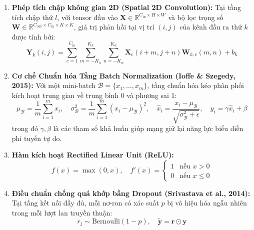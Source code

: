 \begin{enumerate}
    \item \textbf{Phép tích chập không gian 2D (Spatial 2D Convolution):} Tại tầng tích chập thứ $l$, với tensor đầu vào $\mathbf{X} \in \mathbb{R}^{C_{\text{in}} \times H \times W}$ và bộ lọc trọng số $\mathbf{W} \in \mathbb{R}^{C_{\text{out}} \times C_{\text{in}} \times K \times K}$, giá trị phản hồi tại vị trí $(i, j)$ của kênh đầu ra thứ $k$ được tính bởi:
    \begin{equation}
        \mathbf{Y}_k(i, j) = \sum_{c=1}^{C_{\text{in}}} \sum_{m=-K_h}^{K_h} \sum_{n=-K_w}^{K_w} \mathbf{X}_c(i+m, j+n) \mathbf{W}_{k,c}(m, n) + b_k
        \label{eq:conv2d}
    \end{equation}

    \item \textbf{Cơ chế Chuẩn hóa Tầng Batch Normalization (Ioffe \& Szegedy, 2015):} Với một mini-batch $\mathcal{B} = \{x_1, \dots, x_m\}$, tầng chuẩn hóa kéo phân phối kích hoạt trung gian về trung bình 0 và phương sai 1:
    \begin{equation}
        \mu_{\mathcal{B}} = \frac{1}{m} \sum_{i=1}^m x_i, \quad \sigma^2_{\mathcal{B}} = \frac{1}{m} \sum_{i=1}^m (x_i - \mu_{\mathcal{B}})^2, \quad \hat{x}_i = \frac{x_i - \mu_{\mathcal{B}}}{\sqrt{\sigma^2_{\mathcal{B}} + \epsilon}}, \quad y_i = \gamma \hat{x}_i + \beta
        \label{eq:batchnorm}
    \end{equation}
    trong đó $\gamma, \beta$ là các tham số khả huấn giúp mạng giữ lại năng lực biểu diễn phi tuyến tự do.

    \item \textbf{Hàm kích hoạt Rectified Linear Unit (ReLU):}
    \begin{equation}
        f(x) = \max(0, x), \quad f'(x) = \begin{cases} 1 & \text{nếu } x > 0 \\ 0 & \text{nếu } x \le 0 \end{cases}
        \label{eq:relu}
    \end{equation}

    \item \textbf{Điều chuẩn chống quá khớp bằng Dropout (Srivastava et al., 2014):} Tại tầng kết nối đầy đủ, mỗi nơ-ron có xác suất $p$ bị vô hiệu hóa ngẫu nhiên trong mỗi lượt lan truyền thuận:
    \begin{equation}
        r_j \sim \text{Bernoulli}(1 - p), \quad \tilde{\mathbf{y}} = \mathbf{r} \odot \mathbf{y}
        \label{eq:dropout}
    \end{equation}
\end{enumerate}

